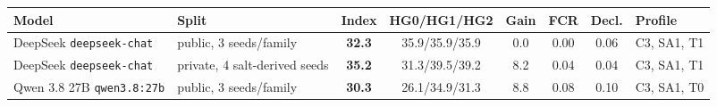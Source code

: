 \begin{tabular}{@{}p{3.2cm}p{2.4cm}cccc c>{\raggedright\arraybackslash}p{1.5cm}@{}}\toprule Model & Split & Index & HG0/HG1/HG2 & Gain & FCR & Decl. & Profile \\ \midrule
DeepSeek \texttt{deepseek-chat} & public, 3 seeds/family & \textbf{32.3} & 35.9/35.9/35.9 & 0.0 & 0.00 & 0.06 & C3, SA1, T1 \\
DeepSeek \texttt{deepseek-chat} & private, 4 salt-derived seeds & \textbf{35.2} & 31.3/39.5/39.2 & 8.2 & 0.04 & 0.04 & C3, SA1, T1 \\
Qwen 3.8 27B \texttt{qwen3.8:27b} & public, 3 seeds/family & \textbf{30.3} & 26.1/34.9/31.3 & 8.8 & 0.08 & 0.10 & C3, SA1, T0 \\
\bottomrule\end{tabular}